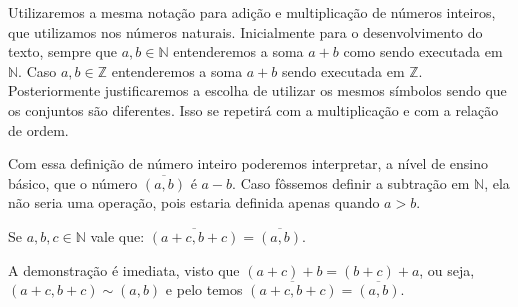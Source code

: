 \documentclass[../main.tex]{subfiles}
\begin{document}
\begin{obs}
    Utilizaremos a mesma notação para adição e multiplicação de números inteiros, que utilizamos nos números naturais. Inicialmente para o desenvolvimento do texto, sempre que $a,b \in \mathbb{N}$ entenderemos a soma $a+b$ como sendo executada em $\mathbb{N}$. Caso $a,b \in \mathbb{Z}$ entenderemos a soma $a+b$ sendo executada em $\mathbb{Z}$. Posteriormente justificaremos a escolha de utilizar os mesmos símbolos sendo que os conjuntos são diferentes. Isso se repetirá com a multiplicação e com a relação de ordem.
\end{obs}

Com essa definição de número inteiro poderemos interpretar, a nível de ensino básico, que o número $\overline{(a,b)}$ é $a - b$. Caso fôssemos definir a subtração em $\mathbb{N}$, ela não seria uma operação, pois estaria definida apenas quando $a > b$.

\begin{prop}\label{int-prop-cancelaCoordenadas}
    Se $a,b,c \in \mathbb{N}$ vale que: $\overline{(a+c,b+c)} = \overline{(a,b)}$.
\end{prop}
\begin{dem}
    A demonstração é imediata, visto que $(a+c)+b = (b+c)+a$, ou seja, $(a+c,b+c) \sim (a,b)$ e pelo  temos $\overline{(a+c,b+c)} = \overline{(a,b)}$.
\end{dem}
\end{document}
